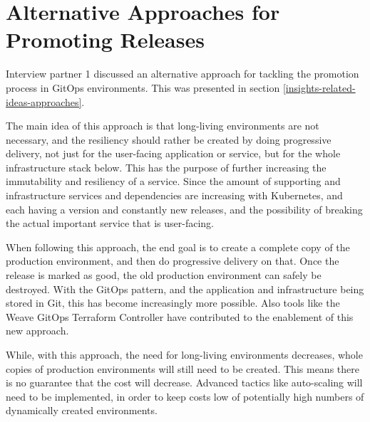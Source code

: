 \section*{Alternative Approaches for Promoting Releases}

Interview partner 1 discussed an alternative approach for tackling the promotion process in GitOps environments.
This was presented in section \ref{insights-related-ideas-approaches}.

The main idea of this approach is that long-living environments are not necessary,
and the resiliency should rather be created by doing progressive delivery,
not just for the user-facing application or service,
but for the whole infrastructure stack below.
This has the purpose of further increasing the immutability and resiliency of a service.
Since the amount of supporting and infrastructure services and dependencies are increasing with Kubernetes,
and each having a version and constantly new releases, and the possibility of breaking the actual important
service that is user-facing.

When following this approach, the end goal is to create a complete copy of the production environment,
and then do progressive delivery on that.
Once the release is marked as good, the old production environment can safely be destroyed.
With the GitOps pattern, and the application and infrastructure being stored in Git,
this has become increasingly more possible.
Also tools like the Weave GitOps Terraform Controller have contributed to the enablement of this new approach. 

While, with this approach, the need for long-living environments decreases,
whole copies of production environments will still need to be created.
This means there is no guarantee that the cost will decrease.
Advanced tactics like auto-scaling will need to be implemented, in order to
keep costs low of potentially high numbers of dynamically created environments.





































